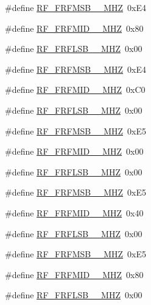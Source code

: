 \begin{DoxyCompactItemize}
\item 
\#define \hyperlink{sx1276Regs-Fsk_8h_a9ec17583ae6938b5f9a1cdaadc5376b2}{R\+F\+\_\+\+F\+R\+F\+M\+S\+B\+\_\+\_\+\+M\+HZ}~0x\+E4
\item 
\#define \hyperlink{sx1276Regs-Fsk_8h_adbcd8c0ac344d059c366381b5c72c058}{R\+F\+\_\+\+F\+R\+F\+M\+I\+D\+\_\+\_\+\+M\+HZ}~0x80
\item 
\#define \hyperlink{sx1276Regs-Fsk_8h_addbb5e073b3813270c984ef1413be95b}{R\+F\+\_\+\+F\+R\+F\+L\+S\+B\+\_\+\_\+\+M\+HZ}~0x00
\item 
\#define \hyperlink{sx1276Regs-Fsk_8h_ad149370afbff5b09fdf963efb76142fb}{R\+F\+\_\+\+F\+R\+F\+M\+S\+B\+\_\+\_\+\+M\+HZ}~0x\+E4
\item 
\#define \hyperlink{sx1276Regs-Fsk_8h_ace60596f70acafb3b57d31bc658e484e}{R\+F\+\_\+\+F\+R\+F\+M\+I\+D\+\_\+\_\+\+M\+HZ}~0x\+C0
\item 
\#define \hyperlink{sx1276Regs-Fsk_8h_a18c46e7d8870d1d8c0a82b8f67be4d5a}{R\+F\+\_\+\+F\+R\+F\+L\+S\+B\+\_\+\_\+\+M\+HZ}~0x00
\item 
\#define \hyperlink{sx1276Regs-Fsk_8h_ad7c62f39d583a8fcd4c15374d8bee1f6}{R\+F\+\_\+\+F\+R\+F\+M\+S\+B\+\_\+\_\+\+M\+HZ}~0x\+E5
\item 
\#define \hyperlink{sx1276Regs-Fsk_8h_af4f0e5b8ac05cd73f32e19dd96ae34cf}{R\+F\+\_\+\+F\+R\+F\+M\+I\+D\+\_\+\_\+\+M\+HZ}~0x00
\item 
\#define \hyperlink{sx1276Regs-Fsk_8h_a806e977236285fcd65eb5c5028a165e5}{R\+F\+\_\+\+F\+R\+F\+L\+S\+B\+\_\+\_\+\+M\+HZ}~0x00
\item 
\#define \hyperlink{sx1276Regs-Fsk_8h_a34b7c4220125ea6aa40f38ac71fc8eab}{R\+F\+\_\+\+F\+R\+F\+M\+S\+B\+\_\+\_\+\+M\+HZ}~0x\+E5
\item 
\#define \hyperlink{sx1276Regs-Fsk_8h_a1bceebac3751bf54d8cc4e4320514a3e}{R\+F\+\_\+\+F\+R\+F\+M\+I\+D\+\_\+\_\+\+M\+HZ}~0x40
\item 
\#define \hyperlink{sx1276Regs-Fsk_8h_aab684a457bd2e8952dc0f8940715bfe9}{R\+F\+\_\+\+F\+R\+F\+L\+S\+B\+\_\+\_\+\+M\+HZ}~0x00
\item 
\#define \hyperlink{sx1276Regs-Fsk_8h_a78d8d7e3f4451c2badb7f3359916d743}{R\+F\+\_\+\+F\+R\+F\+M\+S\+B\+\_\+\_\+\+M\+HZ}~0x\+E5
\item 
\#define \hyperlink{sx1276Regs-Fsk_8h_a1546e90f6f3410863a32080331820bbf}{R\+F\+\_\+\+F\+R\+F\+M\+I\+D\+\_\+\_\+\+M\+HZ}~0x80
\item 
\#define \hyperlink{sx1276Regs-Fsk_8h_a9ff02de3ac5b8834425db22bd9c08aa0}{R\+F\+\_\+\+F\+R\+F\+L\+S\+B\+\_\+\_\+\+M\+HZ}~0x00

\end{DoxyCompactItemize}
